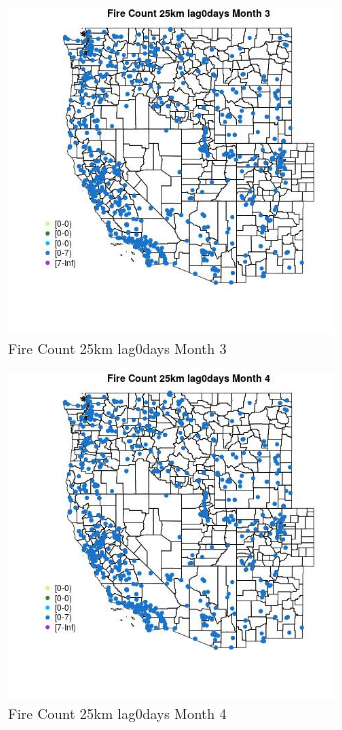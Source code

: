 \begin{figure} 
\centering  
\includegraphics[width=0.77\textwidth]{Code_Outputs/Report_ML_input_PM25_Step4_part_e_de_duplicated_aves_compiled_2019-05-21wNAs_MapObsMo3Fire_Count_25km_lag0days.jpg} 
\caption{\label{fig:Report_ML_input_PM25_Step4_part_e_de_duplicated_aves_compiled_2019-05-21wNAsMapObsMo3Fire_Count_25km_lag0days}Fire Count 25km lag0days Month 3} 
\end{figure} 
 

\begin{figure} 
\centering  
\includegraphics[width=0.77\textwidth]{Code_Outputs/Report_ML_input_PM25_Step4_part_e_de_duplicated_aves_compiled_2019-05-21wNAs_MapObsMo4Fire_Count_25km_lag0days.jpg} 
\caption{\label{fig:Report_ML_input_PM25_Step4_part_e_de_duplicated_aves_compiled_2019-05-21wNAsMapObsMo4Fire_Count_25km_lag0days}Fire Count 25km lag0days Month 4} 
\end{figure} 
 

